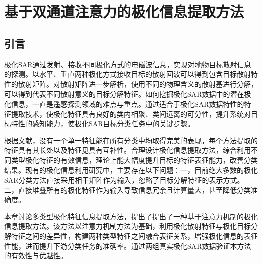 \chapter{基于双通道注意力的极化信息提取方法}
\section{引言}
极化SAR通过发射、接收不同极化方式的电磁波信息，实现对地物目标散射信息的探测。以水平、垂直两种极化方式接收目标的散射回波可以得到包含目标散射特性的散射矩阵。对散射矩阵进一步解析，使用不同的物理含义的散射基进行分解，可以得到代表不同散射意义的目标分解特征。如何挖掘极化SAR数据中的潜在极化信息，一直是遥感探测领域的难点与重点。通过适合于极化SAR数据特性的特征提取技术，使极化特征具有良好的类内相聚、类间远离的可分性，提升系统对目标特性的感知能力，使极化SAR目标分类任务中的关键步骤。

根据文献\cite{}，没有一个单一特征能在所有分类中均取得完美的表现，每个方法提取的特征具有其长处以及特征见具有互补性。合理设计极化信息提取方法，综合利用不同类型极化特征的有效信息，理论上能大幅度提升目标的特征表征能力，改善分类结果。现有的极化信息利用研究中，主要存在以下问题：一，目前绝大多数的极化SAR分类方法直接采用相干矩阵作为输入，忽略了目标分解特征的表示方式。二，直接堆叠所有的极化特征作为输入导致信息冗余且计算量大，甚至降低分类准确度。

本章讨论多类型极化特征信息提取方法，提出了提出了一种基于注意力机制的极化信息提取方法。该方法以注意力机制方法为基础，利用极化散射特征与极化目标分解特征之间的差异性，构建两种类型特征之间融合表征关系，增强极化信息的表征性能，进而提升下游分类任务的准确率。通过两组真实极化SAR数据验证本方法的有效性与优越性。




